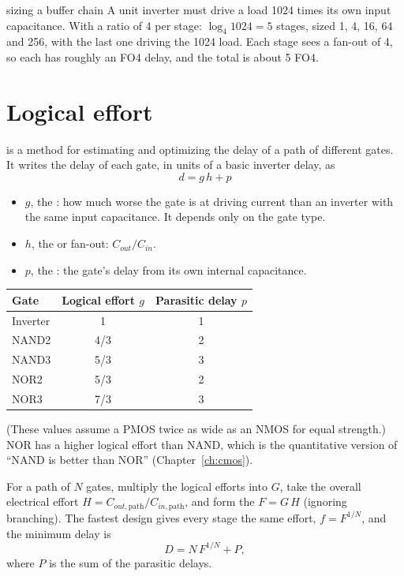 \begin{worked}{sizing a buffer chain}
A unit inverter must drive a load 1024 times its own input capacitance. With a ratio of 4 per stage: $\log_4 1024 = 5$ stages, sized 1, 4, 16, 64 and 256, with the last one driving the 1024 load. Each stage sees a fan-out of 4, so each has roughly an FO4 delay, and the total is about 5 FO4.
\end{worked}

\section{Logical effort}
\label{sec:logeffort}

 is a method for estimating and optimizing the delay of a path of different gates. It writes the delay of each gate, in units of a basic inverter delay, as
\[
  d = g\,h + p
\]
\begin{itemize}
  \item $g$, the : how much worse the gate is at driving current than an inverter with the same input capacitance. It depends only on the gate type.
  \item $h$, the  or fan-out: $C_{out}/C_{in}$.
  \item $p$, the : the gate's delay from its own internal capacitance.
\end{itemize}

\begin{center}
\begin{tabular}{lcc}
\toprule
Gate & Logical effort $g$ & Parasitic delay $p$ \\
\midrule
Inverter & 1 & 1 \\
NAND2 & 4/3 & 2 \\
NAND3 & 5/3 & 3 \\
NOR2 & 5/3 & 2 \\
NOR3 & 7/3 & 3 \\
\bottomrule
\end{tabular}
\end{center}
(These values assume a PMOS twice as wide as an NMOS for equal strength.) NOR has a higher logical effort than NAND, which is the quantitative version of ``NAND is better than NOR'' (Chapter~\ref{ch:cmos}).

For a path of $N$ gates, multiply the logical efforts into $G$, take the overall electrical effort $H = C_{out,\text{path}}/C_{in,\text{path}}$, and form the  $F = G\,H$ (ignoring branching). The fastest design gives every stage the same effort, $f = F^{1/N}$, and the minimum delay is
\[
  D = N\,F^{1/N} + P,
\]
where $P$ is the sum of the parasitic delays.

